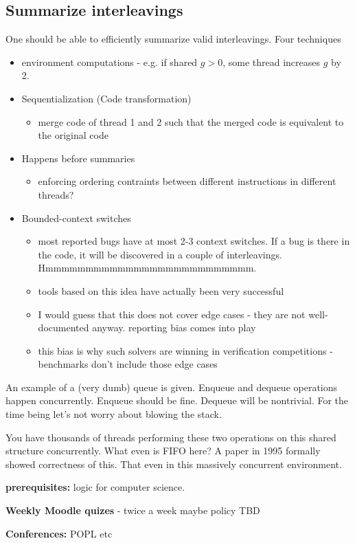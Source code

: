 \documentclass[a4paper]{article}
\begin{document}
\subsection{Summarize interleavings}
One should be able to efficiently summarize valid interleavings.
Four techniques
\begin{itemize}
	\item environment computations - e.g. if shared $g>0$, some
		thread increases $g$ by 2.
	\item Sequentialization (Code transformation)
		\begin{itemize}
			\item merge code of thread 1 and 2 such that the merged code is equivalent to the original code
		\end{itemize}
	\item Happens before summaries
		\begin{itemize}
			\item enforcing ordering contraints between
				different instructions in different threads?
		\end{itemize}
	\item Bounded-context switches
		\begin{itemize}
			\item most reported bugs have at most 2-3 context switches. If a bug is there in the code, it will be discovered in a couple of interleavings. Hmmmmmmmmmmmmmmmmmmmmmmmmmm.
			\item tools based on this idea have actually
				been very  successful
			\item I would guess that this does not cover
				edge cases - they are not well-documented anyway. reporting bias comes into play
			\item this bias is why such solvers are winning
				in verification competitions - benchmarks
				don't include those edge cases
		\end{itemize}
\end{itemize}

An example of a (very dumb) queue is given. Enqueue and dequeue operations happen
concurrently. Enqueue should be fine. Dequeue will be nontrivial.
For  the time being let's not worry  about blowing the stack.

You have thousands of threads performing these two operations  on this
shared structure concurrently. What even is FIFO here? A paper in 1995
formally showed correctness of this. That even in this massively concurrent
environment.

\textbf{prerequisites:} logic for computer  science.

\textbf{Weekly Moodle quizes } - twice a week maybe policy TBD

\textbf{Conferences:} POPL etc
\end{document}
